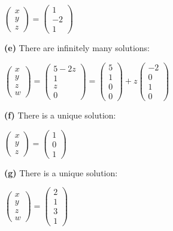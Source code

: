 \documentclass[oneside,12pt]{amsart}
\begin{document}
\bigskip

$
\begin{pmatrix}
x \\  y \\ z
\end{pmatrix}
=
\begin{pmatrix}
1 \\
-2 \\
1
\end{pmatrix}
$

\bigskip

\textbf{(e)}  There are infinitely many solutions:

\bigskip

$
\begin{pmatrix}
x \\  y \\z \\ w
\end{pmatrix}
=
\begin{pmatrix}
5-2z \\
1 \\
z \\
0
\end{pmatrix}
=
\begin{pmatrix}
5\\
1 \\
0 \\
0
\end{pmatrix}
+
z
\begin{pmatrix}
-2 \\
0 \\
1 \\
0
\end{pmatrix}
$


\bigskip

\textbf{(f)} There is a unique solution:

\bigskip

$
\begin{pmatrix}
x \\  y \\ z
\end{pmatrix}
=
\begin{pmatrix}
1 \\
0 \\
1
\end{pmatrix}
$

\bigskip

\textbf{(g)} There is a unique solution:

\bigskip

$
\begin{pmatrix}
x \\  y \\ z \\ w
\end{pmatrix}
=
\begin{pmatrix}
2 \\
1 \\
3 \\
1
\end{pmatrix}
$

\bigskip
\end{document}
